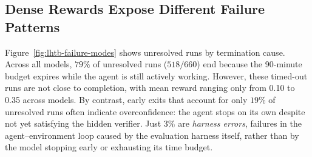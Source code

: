 








% 

\subsection{Dense Rewards Expose Different Failure Patterns}
\label{sec:analysis-timeout}



Figure~\ref{fig:lhtb-failure-modes} shows unresolved runs by termination cause.
%
Across all models, $79\%$ of unresolved runs ($518/660$) end because the 90-minute budget expires while the agent is still actively working.
%
However, these timed-out runs are not close to completion, with mean reward ranging only from 0.10 to 0.35 across models.
%
By contrast, early exits that account for only $19\%$ of unresolved runs often indicate overconfidence: the agent stops on its own despite not yet satisfying the hidden verifier.
%
Just $3\%$ are \emph{harness errors}, failures in the agent--environment loop caused by the evaluation harness itself, rather than by the model stopping early or exhausting its time budget.


